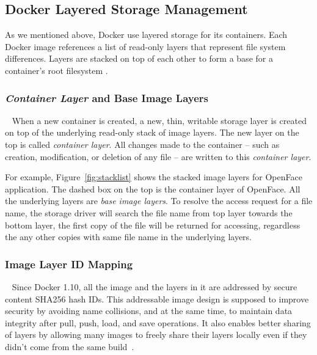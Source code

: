 
\subsection{Docker Layered Storage Management}\label{aufsIntroduction}

As we mentioned above, Docker use layered storage for its containers. Each Docker image references a list of read-only layers that represent file system differences. Layers are stacked on top of each other to form a base for a container's root filesystem \cite{dockerlayer}. 



\smallbreak

\subsubsection{\textit{Container Layer} and Base Image Layers}
~\smallbreak
When a new container is created, a new, thin, writable storage layer is created on top of the underlying read-only stack of image layers. The new layer on the top is called  \textit{container layer}. All changes made to the container -- such as creation, modification, or deletion of any file -- are written to this \textit{container layer}\cite{dockerlayer}.

For example, 
Figure~\ref{fig:stacklist} shows the stacked image layers for OpenFace application. The dashed box on the top is the container layer of OpenFace. All the underlying layers are \textit{base image layers}. To resolve the access request for a file name, the storage driver will search the file name from top layer towards the bottom layer, the first copy of the file will be returned for accessing, regardless the any other copies with same file name in the underlying layers.




\smallbreak
\subsubsection{Image Layer ID Mapping}
~\smallbreak
Since Docker 1.10, all the image and the layers in it are addressed by secure content SHA256 hash IDs. 
This addressable image design is supposed to improve security by avoiding name collisions, and at the same time, to maintain data integrity after pull, push, load, and save operations. It also enables better sharing of layers by allowing many images to freely share their layers locally even if they didn't come from the same build~\cite{dockerlayer}. 

